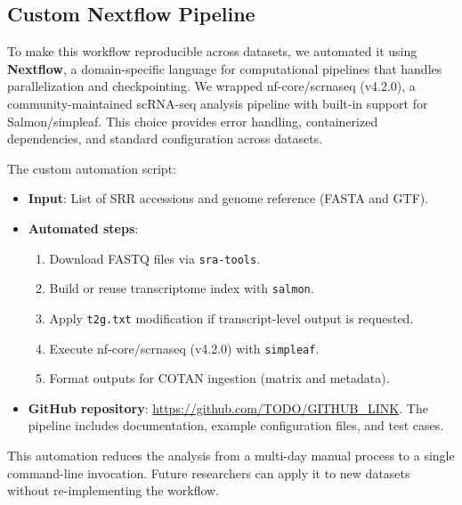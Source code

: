 \subsection*{Custom Nextflow Pipeline}

To make this workflow reproducible across datasets, we automated it using \textbf{Nextflow}, a domain-specific language for computational pipelines that handles parallelization and checkpointing. We wrapped nf-core/scrnaseq (v4.2.0), a community-maintained scRNA-seq analysis pipeline with built-in support for Salmon/simpleaf. This choice provides error handling, containerized dependencies, and standard configuration across datasets.

The custom automation script:

\begin{itemize}
    \item \textbf{Input}: List of SRR accessions and genome reference (FASTA and GTF).
    \item \textbf{Automated steps}:
    \begin{enumerate}
        \item Download FASTQ files via \texttt{sra-tools}.
        \item Build or reuse transcriptome index with \texttt{salmon}.
        \item Apply \texttt{t2g.txt} modification if transcript-level output is requested.
        \item Execute nf-core/scrnaseq (v4.2.0) with \texttt{simpleaf}.
        \item Format outputs for COTAN ingestion (matrix and metadata).
    \end{enumerate}

    \item \textbf{GitHub repository}: \url{https://github.com/TODO/GITHUB_LINK}. The pipeline includes documentation, example configuration files, and test cases.
\end{itemize}

This automation reduces the analysis from a multi-day manual process to a single command-line invocation. Future researchers can apply it to new datasets without re-implementing the workflow.


